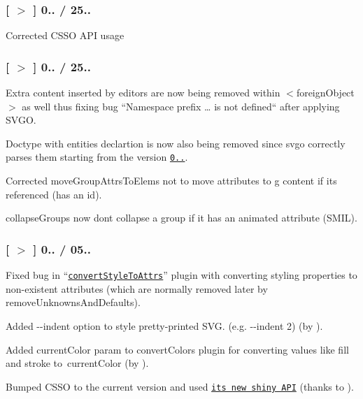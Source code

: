 \subsubsection*{\mbox{[} \href{https://github.com/svg/svgo/tree/v0.6.6}{\tt $>$} \mbox{]} 0.. / 25..}


\begin{DoxyItemize}
\item Corrected C\+S\+SO A\+PI usage
\end{DoxyItemize}

\subsubsection*{\mbox{[} \href{https://github.com/svg/svgo/tree/v0.6.5}{\tt $>$} \mbox{]} 0.. / 25..}


\begin{DoxyItemize}
\item Extra content inserted by editors are now being removed within {\ttfamily $<$foreign\+Object$>$} as well thus fixing bug “\+Namespace prefix … is not defined“ after applying S\+V\+GO.
\item Doctype with entities declartion is now also being removed since svgo correctly parses them starting from the version \href{https://github.com/svg/svgo/tree/v0.6.2}{\tt 0..}.
\item Corrected {\ttfamily move\+Group\+Attrs\+To\+Elems} not to move attributes to {\ttfamily g} content if it\textquotesingle{}s referenced (has an {\ttfamily id}).
\item {\ttfamily collapse\+Groups} now don\textquotesingle{}t collapse a group if it has an animated attribute (S\+M\+IL).
\end{DoxyItemize}

\subsubsection*{\mbox{[} \href{https://github.com/svg/svgo/tree/v0.6.4}{\tt $>$} \mbox{]} 0.. / 05..}


\begin{DoxyItemize}
\item Fixed bug in “\href{https://github.com/svg/svgo/blob/master/plugins/convertStyleToAttrs.js}{\tt convert\+Style\+To\+Attrs}” plugin with converting styling properties to non-\/existent attributes (which are normally removed later by {\ttfamily remove\+Unknowns\+And\+Defaults}).
\item Added {\ttfamily -\/-\/indent} option to style pretty-\/printed S\+VG. (e.\+g. {\ttfamily -\/-\/indent 2}) (by ).
\item Added {\ttfamily current\+Color} param to {\ttfamily convert\+Colors} plugin for converting values like {\ttfamily fill} and {\ttfamily stroke} to {\ttfamily current\+Color} (by ).
\item Bumped C\+S\+SO to the current version and used \href{https://github.com/css/csso#api}{\tt its new shiny A\+PI} (thanks to ).
\end{DoxyItemize}

